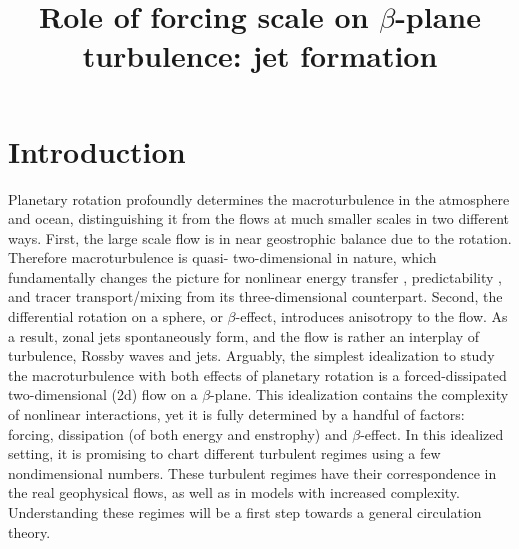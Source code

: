 \documentclass{ametsoc}
\title{Role of forcing scale on $\beta$-plane turbulence: jet formation}
\affiliation{Atmospheric and Oceanic Sciences Program, Princeton University, Princeton, New Jersey}
\begin{document}
\maketitle


%
\section{Introduction}

Planetary rotation profoundly determines the macroturbulence in the
atmosphere and ocean, distinguishing it from the flows at much smaller
scales in two different ways. First, the large scale flow is in near
geostrophic balance due to the rotation. Therefore macroturbulence
is quasi- two-dimensional in nature, which fundamentally changes the
picture for nonlinear energy transfer \citep{Kraichnan1967,Charney1971},
predictability \citep{Leith1971,Leith1972}, and tracer transport/mixing
\citep{Batchelor1959,Shuckburgh2003} from its three-dimensional counterpart.
Second, the differential rotation on a sphere, or $\beta$-effect,
introduces anisotropy to the flow. As a result, zonal jets spontaneously
form, and the flow is rather an interplay of turbulence, Rossby waves
and jets. Arguably, the simplest idealization to study the macroturbulence
with both effects of planetary rotation is a forced-dissipated two-dimensional
(2d) flow on a $\beta$-plane. This idealization contains the complexity
of nonlinear interactions, yet it is fully determined by a handful
of factors: forcing, dissipation (of both energy and enstrophy) and
$\beta$-effect. In this idealized setting, it is promising to chart
different turbulent regimes using a few nondimensional numbers.
These turbulent regimes have their correspondence in the real geophysical
flows, as well as in models with increased complexity. Understanding
these regimes will be a first step towards a general circulation theory.
\end{document}

